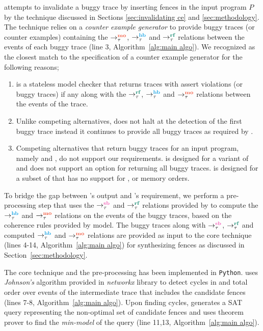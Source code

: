 \ourtechnique attempts to invalidate a buggy trace 
by inserting \cc fences in the input program $P$
by the technique discussed in Sections
\ref{sec:invalidating ce} and \ref{sec:methodology}.
%
The technique relies on a {\em counter example generator} 
to provide buggy traces (or counter examples) containing
the $\setMO$, $\setHB$ and $\setRF$ relations between the 
events of each buggy trace (line 3, 
Algorithm~\ref{alg:main algo}).
%
We recognized \cds \cite{cds} as the closest match to the
specification of a counter example generator
for the following reasons;

\begin{enumerate}
	\item \cds is a stateless model checker that returns traces 
		with assert violations (or buggy traces) if any along with 
		the $\setRF$, $\setHB$ and $\setMO$ relations between the 
		events of the trace.
	
	\item Unlike competing alternatives, \cds does not halt at the 
		detection of the first buggy trace instead it continues to 
		provide all buggy traces as required by \ourtechnique.
	
	\item Competing alternatives that return buggy traces for an 
		input program, namely \genmc \cite{genmc-PLDI19} and \tracer 
		\cite{tracer2018}, do not support our requirements.
		\genmc is designed for a variant of \cc 
		\cite{LahavVafeiadis-PLDI17} and does not support an option 
		for returning all buggy traces. 
		\tracer is designed for a subset of \cc that has no support 
		for \sc, \na or \rel memory orders. 
\end{enumerate}

To bridge the gap between \cds's output and \ourtechnique's requirement,
we perform a pre-processing step that uses the $\setSB$ and $\setRF$ 
relations provided by \cds to compute the $\setHB$ and $\setMO$ relations 
on the events of the buggy traces, based on the coherence rules provided 
by \cc model.
%
The buggy traces along with $\setSB$, $\setRF$ and computed $\setHB$ 
and $\setMO$ relations are provided as input to the core technique 
(lines 4-14, Algorithm~\ref{alg:main algo}) for synthesizing fences as
discussed in Section~\ref{sec:methodology}.

The core technique and the pre-processing has been implemented in 
{\tt Python}.
\ourtechnique uses {\em Johnson's} algorithm provided in {\em networkx}
library to detect cycles in  and
\sc total order over 
events of the intermediate trace that includes the 
candidate fences (lines 7-8, Algorithm~\ref{alg:main algo}).
%
Upon finding cycles, \ourtechnique generates a SAT query 
representing the non-optimal set of candidate fences and
uses \z theorem prover to find the {\em min-model} of the 
query (line 11,13, Algorithm~\ref{alg:main algo}).

